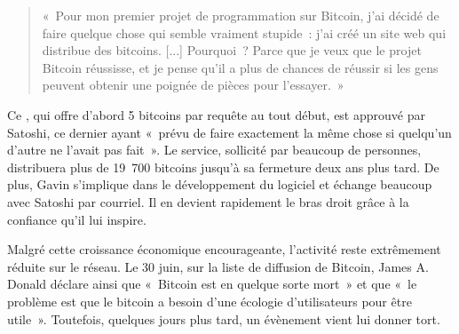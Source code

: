 \begin{quote}
«~Pour mon premier projet de programmation sur Bitcoin, j'ai décidé de faire quelque chose qui semble vraiment stupide~: j'ai créé un site web qui distribue des bitcoins. [...] Pourquoi~? Parce que je veux que le projet Bitcoin réussisse, et je pense qu'il a plus de chances de réussir si les gens peuvent obtenir une poignée de pièces pour l'essayer.~»
\end{quote}

Ce , qui offre d'abord 5 bitcoins par requête au tout début, est approuvé par Satoshi, ce dernier ayant «~prévu de faire exactement la même chose si quelqu'un d'autre ne l'avait pas fait~». Le service, sollicité par beaucoup de personnes, distribuera plus de 19~700 bitcoins jusqu'à sa fermeture deux ans plus tard. %
De plus, Gavin s'implique dans le développement du logiciel et échange beaucoup avec Satoshi par courriel. Il en devient rapidement le bras droit grâce à la confiance qu'il lui inspire.

Malgré cette croissance économique encourageante, l'activité reste extrêmement réduite sur le réseau. Le 30 juin, sur la liste de diffusion de Bitcoin, James A. Donald déclare ainsi que «~Bitcoin est en quelque sorte mort~» et que «~le problème est que le bitcoin a besoin d'une écologie d'utilisateurs pour être utile~». Toutefois, quelques jours plus tard, un évènement vient lui donner tort.

